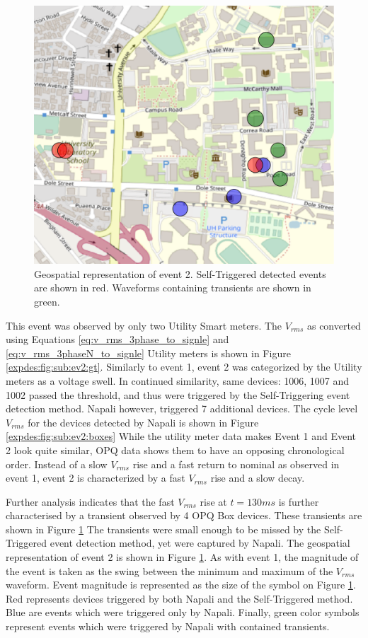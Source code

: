 \begin{figure}[!ht]
    \centering
    \includegraphics[width=0.7\linewidth]{img/napali_eval/subthreshold/ev2/map.pdf}
    \caption{Geospatial representation of event 2.
    Self-Triggered detected events are shown in red.
    Waveforms containing transients are shown in green.}
    \label{expdes:fig:sub:ev2:map}
\end{figure}

This event was observed by only two Utility Smart meters.
The $V_{rms}$ as converted using Equations \ref{eq:v_rms_3phase_to_signle} and \ref{eq:v_rms_3phaseN_to_signle} Utility meters is shown in Figure \ref{expdes:fig:sub:ev2:gt}.
Similarly to event 1, event 2 was categorized by the Utility meters as a voltage swell.
In continued similarity, same devices: 1006, 1007 and 1002 passed the threshold, and thus were triggered by the Self-Triggering event detection method.
Napali however, triggered 7 additional devices.
The cycle level $V_{rms}$ for the devices detected by Napali is shown in Figure \ref{expdes:fig:sub:ev2:boxes}
While the utility meter data makes Event 1 and Event 2 look quite similar, OPQ data shows them to have an opposing chronological order.
Instead of a slow $V_{rms}$ rise and a fast return to nominal as observed in event 1, event 2 is characterized by a fast $V_{rms}$ rise and a slow decay.

Further analysis indicates that the fast $V_{rms}$ rise at $t=130ms$ is further characterised by a transient observed by 4 OPQ Box devices.
These transients are shown in Figure \ref{expdes:fig:sub:ev2:map}
The transients were small enough to be missed by the Self-Triggered event detection method, yet were captured by Napali.
The geospatial representation of event 2 is shown in Figure \ref{expdes:fig:sub:ev2:map}.
As with event 1, the magnitude of the event is taken as the swing between the minimum and maximum of the $V_{rms}$ waveform.
Event magnitude is represented as the size of the symbol on Figure \ref{expdes:fig:sub:ev2:map}.
Red represents devices triggered by both Napali and the Self-Triggered method.
Blue are events which were triggered only by Napali.
Finally, green color symbols represent events which were triggered by Napali with contained transients.

